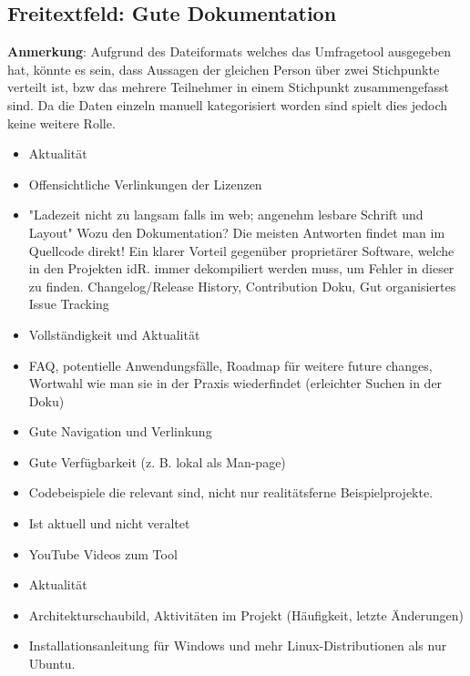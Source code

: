 \subsection{Freitextfeld: Gute Dokumentation}

\textbf{Anmerkung}: Aufgrund des Dateiformats welches das Umfragetool ausgegeben hat, könnte es sein, dass Aussagen
der gleichen Person über zwei Stichpunkte verteilt ist, bzw das mehrere Teilnehmer in einem Stichpunkt zusammengefasst sind.
Da die Daten einzeln manuell kategorisiert worden sind spielt dies jedoch keine weitere Rolle.

\begin{multicols}{2}
    \begin{itemize}
        \setlength\itemsep{0em}
        \item Aktualität
        \item Offensichtliche Verlinkungen der Lizenzen
        \item "Ladezeit nicht zu langsam falls im web; angenehm lesbare Schrift und Layout"
              Wozu den Dokumentation? Die meisten Antworten findet man im Quellcode direkt! Ein klarer Vorteil gegenüber proprietärer Software, welche in den Projekten idR. immer dekompiliert werden muss, um Fehler in dieser zu finden.
              Changelog/Release History, Contribution Doku, Gut organisiertes Issue Tracking
        \item Vollständigkeit und Aktualität
        \item FAQ, potentielle Anwendungsfälle, Roadmap für weitere future changes, Wortwahl wie man sie in der Praxis wiederfindet (erleichter Suchen in der Doku)
        \item Gute Navigation und Verlinkung
        \item Gute Verfügbarkeit (z. B. lokal als Man-page)
        \item Codebeispiele die relevant sind, nicht nur realitätsferne Beispielprojekte.
        \item Ist aktuell und nicht veraltet
        \item YouTube Videos zum Tool
        \item Aktualität
        \item Architekturschaubild, Aktivitäten im Projekt (Häufigkeit, letzte Änderungen)
        \item Installationsanleitung für Windows und mehr Linux-Distributionen als nur Ubuntu.

\end{itemize}
\end{multicols}
